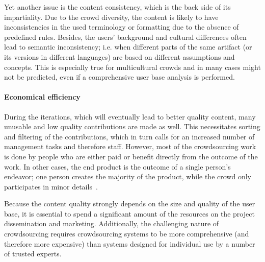 \documentclass[PhD, Submit, ngerman,UKenglish,table]{scrbook}
\begin{document}
Yet another issue is the content consistency, which is the back side of its impartiality. 
Due to the crowd diversity, the content is likely to have inconsistencies in the used terminology or formatting due to the absence of predefined rules.
Besides, the users' background and cultural differences often lead to semantic inconsistency; i.e. when different parts of the same artifact (or its versions in different languages) are based on different assumptions and concepts.  
This is especially true for multicultural crowds and in many cases might not be predicted, even if a comprehensive user base analysis is performed. 
  

%
%
%


\paragraph{Economical efficiency}

During the iterations, which will eventually lead to better quality content, many unusable and low quality contributions are made as well.
This necessitates sorting and filtering of the contributions, which in turn calls for an increased number of management tasks and therefore staff. 
However, most of the crowdsourcing work is done by people who are either paid or benefit directly from the outcome of the work.
In other cases, the end product is the outcome of a single person's endeavor; one person creates the majority of the product, while the crowd only participates in minor details~\cite{woods2009myth}.

Because the content quality strongly depends on the size and quality of the user base, it is essential to spend a significant amount of the resources on the project dissemination and marketing. 
Additionally, the challenging nature of crowdsourcing requires crowdsourcing systems to be more comprehensive (and therefore more expensive) than systems designed for individual use by a number of trusted experts.
\end{document}
